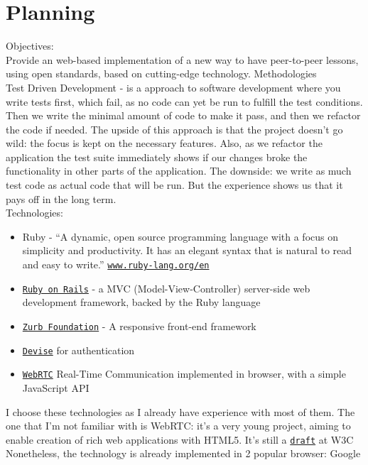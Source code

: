 \section{Planning}
Objectives:\\
Provide an web-based implementation of a new way to have peer-to-peer lessons,
using open standards, based on cutting-edge technology.
Methodologies\\
Test Driven Development - is a approach to software development where you write
tests first, which fail, as no code can yet be run to fulfill
the test conditions. Then we write the minimal amount of code to make it pass,
and then we refactor the code if needed.
The upside of this approach is that the project doesn't go wild: the focus is
kept on the necessary features. Also, as we refactor the application
the test suite immediately shows if our changes broke the functionality in other
parts of the application.
The downside: we write as much test code as actual code that will be run. But
the experience shows us that it pays off in the long term.\\
Technologies:
\begin{itemize}
    \item Ruby - ``A dynamic, open source programming language with a focus on
        simplicity and productivity.
        It has an elegant syntax that is natural to read and easy to write.''
        \href{https://wwww.ruby-lang.org/en/}{\texttt{www.ruby-lang.org/en}}
    \item \href{http://rubyonrails.org}{\texttt{Ruby on Rails}} - a MVC
        (Model-View-Controller) server-side web development framework, backed by
        the Ruby language
    \item \href{http://foundation.zurb.com/}{\texttt{Zurb Foundation}} - A
        responsive front-end framework
    \item \href{https://github.com/plataformatec/devise}{\texttt{Devise}} for
        authentication
    \item \href{http://www.webrtc.org/}{\texttt{WebRTC}} Real-Time Communication
        implemented in browser, with a simple JavaScript API
\end{itemize}
I choose these technologies as I already have experience with most of them. The
one that I'm not familiar with is WebRTC:
it's a very young project, aiming to enable creation of rich web applications
with HTML5. It's still a
\href{http://dev.w3.org/2011/webrtc/editor/webrtc.html}{\texttt{draft}} at W3C
Nonetheless, the technology is already implemented in 2 popular browser: Google
